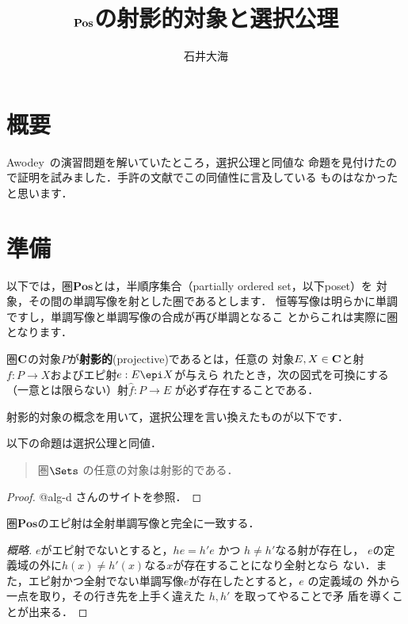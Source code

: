 \documentclass[a4j]{ltjsarticle}
\title{$\Pos$の射影的対象と選択公理}
\author{石井大海}
\newcommand{\Pos}{\mathbf{Pos}}
\begin{document}
\maketitle
\section{概要}
Awodey~\cite{Awodey:2010}の演習問題を解いていたところ，選択公理と同値な
命題を見付けたので証明を試みました．手許の文献でこの同値性に言及している
ものはなかったと思います．
\section{準備}
以下では，圏$\Pos$とは，半順序集合（partially ordered set，以下poset）を
対象，その間の単調写像を射とした圏であるとします．
恒等写像は明らかに単調ですし，単調写像と単調写像の合成が再び単調となるこ
とからこれは実際に圏となります．

\begin{definition}[射影的]
 圏${\bf C}$の対象$P$が{\bfseries 射影的}(projective)であるとは，任意の
 対象$E, X \in {\bf C}$と射$f: P \to X$およびエピ射$e: E \epi X$が与えら
 れたとき，次の図式を可換にする（一意とは限らない）射$\hat{f}: P \to E$
 が必ず存在することである．

 \begin{center}
 \end{center}
\end{definition}

射影的対象の概念を用いて，選択公理を言い換えたものが以下です．
\begin{theorem}\label{projective}
 以下の命題は選択公理と同値．
 \begin{quotation}
  圏$\Sets$ の任意の対象は射影的である．
 \end{quotation}
\end{theorem}
\begin{proof}
 @alg-d さんのサイト\cite{alg-d}を参照．
\end{proof}

\begin{theorem}\label{epi and surj}
 圏$\Pos$のエピ射は全射単調写像と完全に一致する．
\end{theorem}
\begin{proof}[概略]
 $e$がエピ射でないとすると，$he = h'e$ かつ $h \neq h'$なる射が存在し，
 $e$の定義域の外に$h(x) \neq h'(x)$なる$x$が存在することになり全射となら
 ない．また，エピ射かつ全射でない単調写像$e$が存在したとすると，$e$ の定義域の
 外から一点を取り，その行き先を上手く違えた $h, h'$ を取ってやることで矛
 盾を導くことが出来る．
\end{proof}
\end{document}
